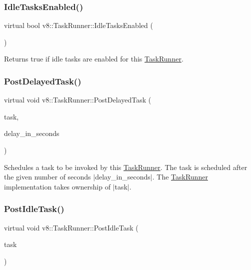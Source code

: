 \subsubsection{\texorpdfstring{Idle\+Tasks\+Enabled()}{IdleTasksEnabled()}}
{\footnotesize\ttfamily virtual bool v8\+::\+Task\+Runner\+::\+Idle\+Tasks\+Enabled (\begin{DoxyParamCaption}{ }\end{DoxyParamCaption})\hspace{0.3cm}{\ttfamily [pure virtual]}}

Returns true if idle tasks are enabled for this \mbox{\hyperlink{classv8_1_1TaskRunner}{Task\+Runner}}. \mbox{\label{classv8_1_1TaskRunner_a8ae45842086210292d966e2e326629a4}} 
\subsubsection{\texorpdfstring{Post\+Delayed\+Task()}{PostDelayedTask()}}
{\footnotesize\ttfamily virtual void v8\+::\+Task\+Runner\+::\+Post\+Delayed\+Task (\begin{DoxyParamCaption}\item[{std\+::unique\+\_\+ptr$<$ \mbox{\hyperlink{classv8_1_1Task}{Task}} $>$}]{task,  }\item[{double}]{delay\+\_\+in\+\_\+seconds }\end{DoxyParamCaption})\hspace{0.3cm}{\ttfamily [pure virtual]}}

Schedules a task to be invoked by this \mbox{\hyperlink{classv8_1_1TaskRunner}{Task\+Runner}}. The task is scheduled after the given number of seconds $\vert$delay\+\_\+in\+\_\+seconds$\vert$. The \mbox{\hyperlink{classv8_1_1TaskRunner}{Task\+Runner}} implementation takes ownership of $\vert$task$\vert$. \mbox{\label{classv8_1_1TaskRunner_a0ebfb362d1cb3fa621f0f50b9ff0fb6f}} 
\subsubsection{\texorpdfstring{Post\+Idle\+Task()}{PostIdleTask()}}
{\footnotesize\ttfamily virtual void v8\+::\+Task\+Runner\+::\+Post\+Idle\+Task (\begin{DoxyParamCaption}\item[{std\+::unique\+\_\+ptr$<$ \mbox{\hyperlink{classv8_1_1IdleTask}{Idle\+Task}} $>$}]{task }\end{DoxyParamCaption})\hspace{0.3cm}{\ttfamily [pure virtual]}}

